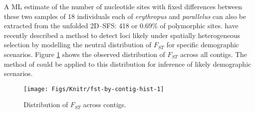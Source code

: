 \documentclass[a4paper,12pt,times,authoryear,twoside,print,index]{Classes/PhDThesisPSnPDF}\usepackage[]{graphicx}\usepackage[]{color}
\newenvironment{knitrout}{}{} %
\begin{document}
A ML estimate of the number of nucleotide sites with fixed differences between these two samples of 18 individuals each of \textit{erythropus} and \textit{parallelus} can also be extracted from the unfolded 2D--\gls{SFS}: 418 or 0.69\% of polymorphic sites. \cite{Whitlock2015} have recently described a method to detect loci likely under spatially heterogeneous selection by modelling the neutral distribution of $F_{ST}$ for specific demographic scenarios. Figure \ref{Fig:fst-by-contig-hist} shows the observed distribution of $F_{ST}$ across all contigs. The method of \cite{Whitlock2015} could be applied to this distribution for inference of likely demographic scenarios.

%
\begin{figure}[htb]
\centering
\begin{knitrout}
\color{fgcolor}

{\centering \texttt{[image: Figs/Knitr/fst-by-contig-hist-1]} 

}



\end{knitrout}
\caption{Distribution of $F_{ST}$ across contigs.}
\label{Fig:fst-by-contig-hist}
\end{figure}
%
\clearpage
%
%
\end{document}

